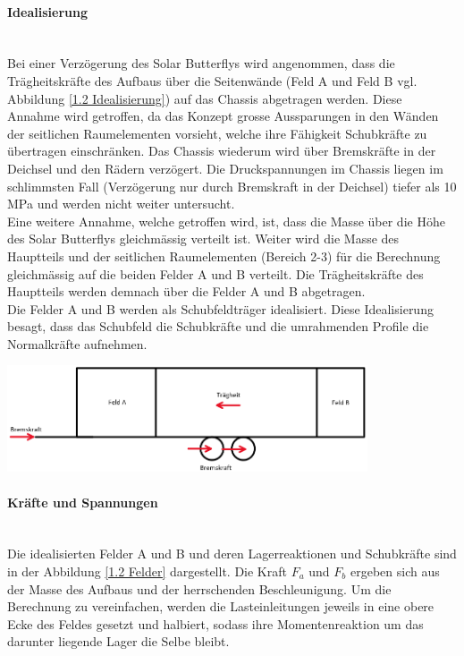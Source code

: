   \paragraph{Idealisierung}\mbox{}\\
  Bei einer Verzögerung des Solar Butterflys wird angenommen, dass die Trägheitskräfte des Aufbaus über die Seitenwände (Feld A und Feld B vgl. Abbildung \ref{1.2 Idealisierung}) auf das Chassis abgetragen werden. Diese Annahme wird getroffen, da das Konzept grosse Aussparungen in den Wänden der seitlichen Raumelementen vorsieht, welche ihre Fähigkeit Schubkräfte zu übertragen einschränken. Das Chassis wiederum wird über Bremskräfte in der Deichsel und den Rädern verzögert. Die Druckspannungen im Chassis liegen im schlimmsten Fall (Verzögerung nur durch Bremskraft in der Deichsel) tiefer als 10 MPa und werden nicht weiter untersucht.\\
  Eine weitere Annahme, welche getroffen wird, ist, dass die Masse über die Höhe des Solar Butterflys gleichmässig verteilt ist. Weiter wird die Masse des Hauptteils und der seitlichen Raumelementen (Bereich 2-3) für die Berechnung gleichmässig auf die beiden Felder A und B verteilt. Die Trägheitskräfte des Hauptteils werden demnach über die Felder A und B abgetragen.\\
  Die Felder A und B werden als Schubfeldträger idealisiert. Diese Idealisierung besagt, dass das Schubfeld die Schubkräfte und die umrahmenden Profile die Normalkräfte aufnehmen.

  \begin{center}
    \includegraphics[width=0.8\textwidth]{04_Figures/1.2 Idealisierung.png}
    \label{1.2 Idealisierung}
  \end{center}

  \paragraph{Kräfte und Spannungen}\mbox{}\\
  Die idealisierten Felder A und B und deren Lagerreaktionen und Schubkräfte sind in der Abbildung \ref{1.2 Felder} dargestellt. Die Kraft $F_a$ und $F_b$ ergeben sich aus der Masse des Aufbaus und der herrschenden Beschleunigung. Um die Berechnung zu vereinfachen, werden die Lasteinleitungen jeweils in eine obere Ecke des Feldes gesetzt und halbiert, sodass ihre Momentenreaktion um das darunter liegende Lager die Selbe bleibt.


